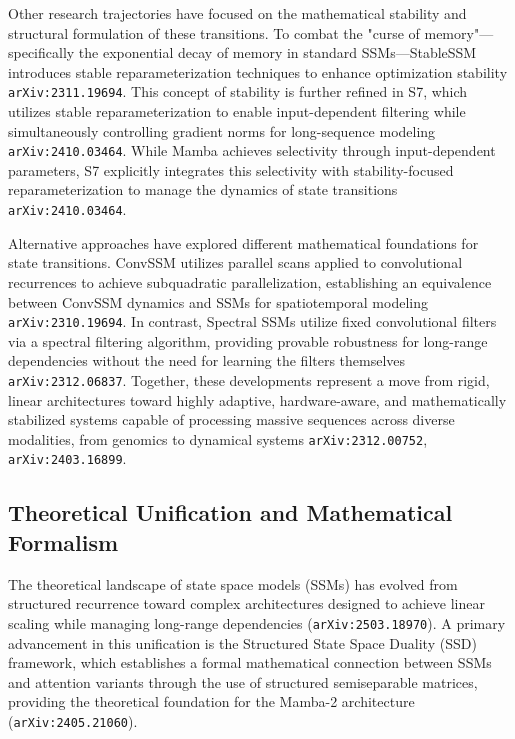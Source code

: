 \documentclass[11pt]{article}
\begin{document}
Other research trajectories have focused on the mathematical stability and structural formulation of these transitions. To combat the "curse of memory"—specifically the exponential decay of memory in standard SSMs—StableSSM introduces stable reparameterization techniques to enhance optimization stability \texttt{arXiv:2311.19694}. This concept of stability is further refined in S7, which utilizes stable reparameterization to enable input-dependent filtering while simultaneously controlling gradient norms for long-sequence modeling \texttt{arXiv:2410.03464}. While Mamba achieves selectivity through input-dependent parameters, S7 explicitly integrates this selectivity with stability-focused reparameterization to manage the dynamics of state transitions \texttt{arXiv:2410.03464}.

Alternative approaches have explored different mathematical foundations for state transitions. ConvSSM utilizes parallel scans applied to convolutional recurrences to achieve subquadratic parallelization, establishing an equivalence between ConvSSM dynamics and SSMs for spatiotemporal modeling \texttt{arXiv:2310.19694}. In contrast, Spectral SSMs utilize fixed convolutional filters via a spectral filtering algorithm, providing provable robustness for long-range dependencies without the need for learning the filters themselves \texttt{arXiv:2312.06837}. Together, these developments represent a move from rigid, linear architectures toward highly adaptive, hardware-aware, and mathematically stabilized systems capable of processing massive sequences across diverse modalities, from genomics to dynamical systems \texttt{arXiv:2312.00752}, \texttt{arXiv:2403.16899}.

\subsection{Theoretical Unification and Mathematical Formalism}

The theoretical landscape of state space models (SSMs) has evolved from structured recurrence toward complex architectures designed to achieve linear scaling while managing long-range dependencies (\texttt{arXiv:2503.18970}). A primary advancement in this unification is the Structured State Space Duality (SSD) framework, which establishes a formal mathematical connection between SSMs and attention variants through the use of structured semiseparable matrices, providing the theoretical foundation for the Mamba-2 architecture (\texttt{arXiv:2405.21060}).
\end{document}
